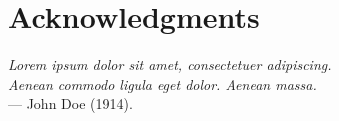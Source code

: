 

\chapter*{Acknowledgments}

\begin{flushright}
{\slshape Lorem ipsum dolor sit amet, consectetuer adipiscing.}\\
{\slshape Aenean commodo ligula eget dolor. Aenean massa.}\\%
\medskip
--- John Doe (1914).%
\end{flushright}

\bigskip

\lipsum[2-5]%
